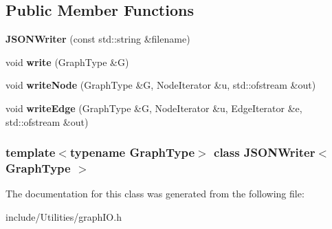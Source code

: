 \subsection*{Public Member Functions}
\begin{DoxyCompactItemize}
\item 
\hypertarget{class_j_s_o_n_writer_a9272c4c9e7a9c729a6564d9b3d9e0e09}{
{\bfseries JSONWriter} (const std::string \&filename)}
\label{class_j_s_o_n_writer_a9272c4c9e7a9c729a6564d9b3d9e0e09}

\item 
\hypertarget{class_j_s_o_n_writer_ad5e142f76d4a975eb64ddbb53ef3dd68}{
void {\bfseries write} (GraphType \&G)}
\label{class_j_s_o_n_writer_ad5e142f76d4a975eb64ddbb53ef3dd68}

\item 
\hypertarget{class_j_s_o_n_writer_a43d25daea3c35766a1e387cb27644c2f}{
void {\bfseries writeNode} (GraphType \&G, NodeIterator \&u, std::ofstream \&out)}
\label{class_j_s_o_n_writer_a43d25daea3c35766a1e387cb27644c2f}

\item 
\hypertarget{class_j_s_o_n_writer_af3167ed0cd824c4f44bfd7357b4329a7}{
void {\bfseries writeEdge} (GraphType \&G, NodeIterator \&u, EdgeIterator \&e, std::ofstream \&out)}
\label{class_j_s_o_n_writer_af3167ed0cd824c4f44bfd7357b4329a7}

\end{DoxyCompactItemize}
\subsubsection*{template$<$typename GraphType$>$ class JSONWriter$<$ GraphType $>$}



The documentation for this class was generated from the following file:\begin{DoxyCompactItemize}
\item 
include/Utilities/graphIO.h\end{DoxyCompactItemize}
